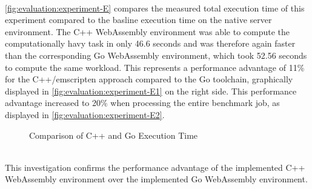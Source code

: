 ~\\
\autoref{fig:evaluation:experiment-E} compares the measured total execution time of this experiment compared to the basline execution time on the native server environment. The C++ WebAssembly environment was able to compute the computationally havy task in only 46.6 seconds and was therefore again faster than the corresponding Go WebAssembly environment, which took 52.56 seconds to compute the same workload. This represents a performance advantage of 11\% for the C++/emscripten approach compared to the Go toolchain, graphically displayed in \autoref{fig:evaluation:experiment-E1} on the right side. This performance advantage increased to 20\% when processing the entire benchmark job, as displayed in \autoref{fig:evaluation:experiment-E2}.
\clearpage
\begin{figure}[htbp] \ContinuedFloat
    \myfloatalign
    \caption{Comparison of C++ and Go Execution Time}
    \label{fig:evaluation:experiment-E}
\end{figure}
~\\
This investigation confirms the performance advantage of the implemented C++ WebAssembly environment over the implemented Go WebAssembly environment.